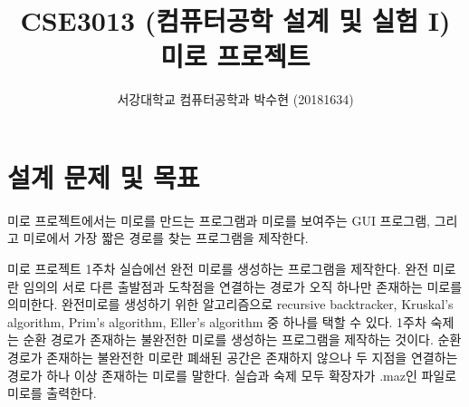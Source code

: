 

\usepackage{color}
\usepackage{pgfplots}

\newdimen\omsq     \omsq=20pt
\newdimen\omrule   \omrule=2pt
\newdimen\omint

\newif\ifvth    \newif\ifhth    \newif\ifomblank
\def\OMINO#1{%
    \vthtrue \hthtrue
    \vbox{ \offinterlineskip\parindent=0pt \OM#1\relax\vskip1pt}
    }

\def\OM#1{%
    \omint=\omsq    \advance\omint-\omrule
    \ifx\relax#1%
    \else
      \ifx\\#1 \newline\null \hthtrue \ifvth\vthfalse\else\vskip-\omrule\vthtrue\fi
      \else%
        \ifx .#1\hskip\ifhth \omrule\else \omint\fi
        \else%
          \ifx +#1\def\colour{black}\fi%
          \ifx -#1\def\colour{black}\fi%
          \ifx |#1\def\colour{black}\fi%
          \ifx @#1\def\colour{black}\fi%
          \ifx X#1\def\colour{gray}\fi%
          \ifx Z#1\def\colour{red}\fi%
          \ifx S#1\def\colour{green}\fi%
          \ifx L#1\def\colour{orange}\fi%
          \ifx J#1\def\colour{blue}\fi%
          \ifx O#1\def\colour{yellow}\fi%
          \ifx T#1\def\colour{magenta}\fi%
          \ifx I#1\def\colour{cyan}\fi%
          \textcolor{\colour}{\rule{\ifhth\omrule\else\omsq\fi}{\ifvth\omrule\else\omsq\fi}}%
          \ifhth\else\hskip -\omrule\fi%
        \fi%
        \ifhth\hthfalse\else\hthtrue\fi%
      \fi%
    \expandafter\OM%
    \fi}

\makeatother

\usepackage{wrapfig}
\usepackage{subfig}



\title{CSE3013 (컴퓨터공학 설계 및 실험 I) \space \newline 미로 프로젝트}
\author{서강대학교 컴퓨터공학과 박수현 (20181634)}
\maketitle

\section{설계 문제 및 목표}

미로 프로젝트에서는 미로를 만드는 프로그램과 미로를 보여주는 GUI 프로그램, 그리고 미로에서 가장 짧은 경로를 찾는 프로그램을 제작한다.

미로 프로젝트 1주차 실습에선 완전 미로를 생성하는 프로그램을 제작한다. 완전 미로란 임의의 서로 다른 출발점과 도착점을 연결하는 경로가 오직 하나만 존재하는 미로를 의미한다.
완전미로를 생성하기 위한 알고리즘으로 recursive backtracker, Kruskal's algorithm, Prim's algorithm, Eller's algorithm 중 하나를 택할 수 있다.
1주차 숙제는 순환 경로가 존재하는 불완전한 미로를 생성하는 프로그램을 제작하는 것이다. 순환 경로가 존재하는 불완전한 미로란 폐쇄된 공간은 존재하지 않으나 두 지점을 연결하는 경로가
하나 이상 존재하는 미로를 말한다. 실습과 숙제 모두 확장자가 .maz인 파일로 미로를 출력한다.

